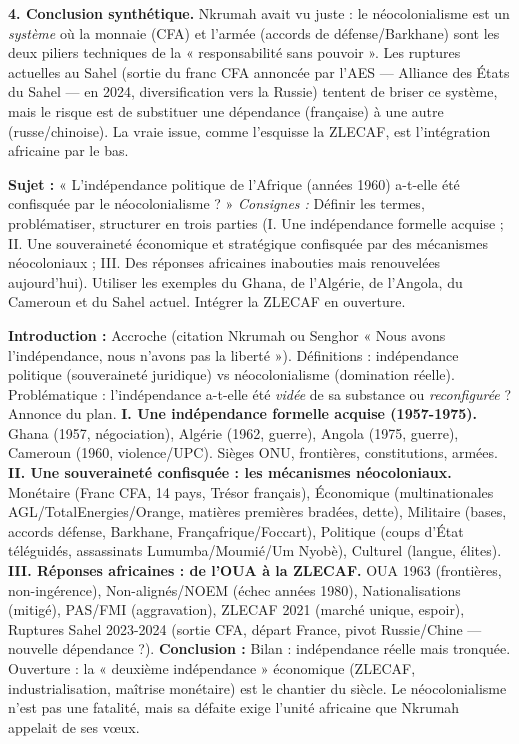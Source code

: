 \documentclass[11pt]{article}
\begin{document}
\begin{exoresolu}
\textbf{4. Conclusion synthétique.}
Nkrumah avait vu juste : le néocolonialisme est un \emph{système} où la monnaie (CFA) et l'armée (accords de défense/Barkhane) sont les deux piliers techniques de la « responsabilité sans pouvoir ». Les ruptures actuelles au Sahel (sortie du franc CFA annoncée par l'AES — Alliance des États du Sahel — en 2024, diversification vers la Russie) tentent de briser ce système, mais le risque est de substituer une dépendance (française) à une autre (russe/chinoise). La vraie issue, comme l'esquisse la ZLECAF, est l'intégration africaine par le bas.
\end{exoresolu}

\begin{exercice}
\textbf{Sujet :} « L'indépendance politique de l'Afrique (années 1960) a-t-elle été confisquée par le néocolonialisme ? »
\textit{Consignes :} Définir les termes, problématiser, structurer en trois parties (I. Une indépendance formelle acquise ; II. Une souveraineté économique et stratégique confisquée par des mécanismes néocoloniaux ; III. Des réponses africaines inabouties mais renouvelées aujourd'hui). Utiliser les exemples du Ghana, de l'Algérie, de l'Angola, du Cameroun et du Sahel actuel. Intégrer la ZLECAF en ouverture.
\end{exercice}

\begin{corrige}
\textbf{Introduction :} Accroche (citation Nkrumah ou Senghor « Nous avons l'indépendance, nous n'avons pas la liberté »). Définitions : indépendance politique (souveraineté juridique) vs néocolonialisme (domination réelle). Problématique : l'indépendance a-t-elle été \emph{vidée} de sa substance ou \emph{reconfigurée} ? Annonce du plan.
\textbf{I. Une indépendance formelle acquise (1957-1975).} Ghana (1957, négociation), Algérie (1962, guerre), Angola (1975, guerre), Cameroun (1960, violence/UPC). Sièges ONU, frontières, constitutions, armées.
\textbf{II. Une souveraineté confisquée : les mécanismes néocoloniaux.} Monétaire (Franc CFA, 14 pays, Trésor français), Économique (multinationales AGL/TotalEnergies/Orange, matières premières bradées, dette), Militaire (bases, accords défense, Barkhane, Françafrique/Foccart), Politique (coups d'État téléguidés, assassinats Lumumba/Moumié/Um Nyobè), Culturel (langue, élites).
\textbf{III. Réponses africaines : de l'OUA à la ZLECAF.} OUA 1963 (frontières, non-ingérence), Non-alignés/NOEM (échec années 1980), Nationalisations (mitigé), PAS/FMI (aggravation), ZLECAF 2021 (marché unique, espoir), Ruptures Sahel 2023-2024 (sortie CFA, départ France, pivot Russie/Chine — nouvelle dépendance ?).
\textbf{Conclusion :} Bilan : indépendance réelle mais tronquée. Ouverture : la « deuxième indépendance » économique (ZLECAF, industrialisation, maîtrise monétaire) est le chantier du siècle. Le néocolonialisme n'est pas une fatalité, mais sa défaite exige l'unité africaine que Nkrumah appelait de ses vœux.
\end{corrige}
\end{document}
